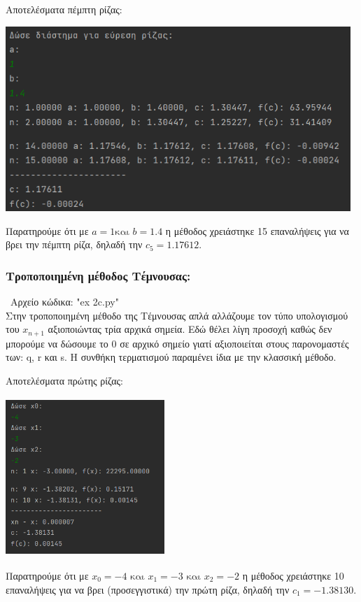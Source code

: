\documentclass{article}
\begin{document}
    \vspace{3mm}
    Αποτελέσματα πέμπτη ρίζας: \\
    \begin{center}\includegraphics[height = 7cm]{images/results_16.png}\end{center}
    Παρατηρούμε ότι με \(a = 1 \text{και } b = 1.4\) η μέθοδος χρειάστηκε 15 επαναλήψεις για να βρει την πέμπτη ρίζα, δηλαδή την \(c_5 = 1.17612\).
    
    \subsubsection{Τροποποιημένη μέθοδος Τέμνουσας:}\
    Αρχείο κώδικα: "ex 2c.py" \\
    
    Στην τροποποιημένη μέθοδο της Τέμνουσας απλά αλλάζουμε τον τύπο υπολογισμού του \(x_{n+1}\) αξιοποιώντας τρία αρχικά σημεία. Εδώ θέλει λίγη προσοχή καθώς δεν μπορούμε να δώσουμε το 0 σε αρχικό σημείο γιατί αξιοποιείται στους παρονομαστές των: q, r και s. Η συνθήκη τερματισμού παραμένει ίδια με την κλασσική μέθοδο.
    
    \pagebreak
    Αποτελέσματα πρώτης ρίζας: \\
    \begin{center}\includegraphics[width = 6cm, height = 6cm]{images/results_17.png}\end{center}
    Παρατηρούμε ότι με \(x_0 = -4 \text{ και } x_1 = -3 \text{ και } x_2 = -2\) η μέθοδος χρειάστηκε 10 επαναλήψεις για να βρει (προσεγγιστικά) την πρώτη ρίζα, δηλαδή την \(c_1 = -1.38130\).
    
\end{document}
